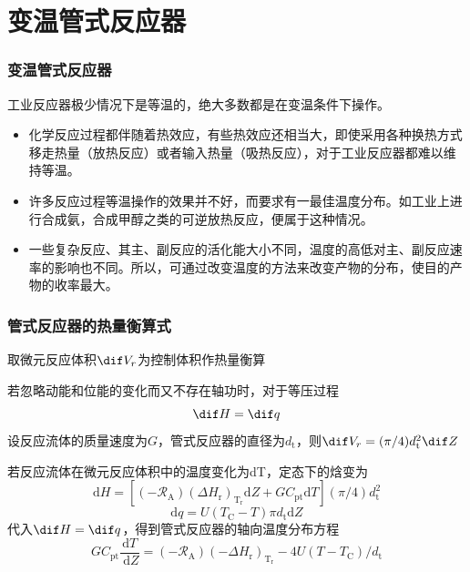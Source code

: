 \section{变温管式反应器}


\begin{frame}
    \frametitle{变温管式反应器}

    工业反应器极少情况下是等温的，绝大多数都是在变温条件下操作。
    \begin{itemize}
        \item 化学反应过程都伴随着热效应，有些热效应还相当大，即使采用各种换热方式移走热量（放热反应）或者输入热量（吸热反应），对于工业反应器都难以维持等温。
        \item 许多反应过程等温操作的效果并不好，而要求有一最佳温度分布。如工业上进行合成氨，合成甲醇之类的可逆放热反应，便属于这种情况。
        \item 一些复杂反应、其主、副反应的活化能大小不同，温度的高低对主、副反应速率的影响也不同。所以，可通过改变温度的方法来改变产物的分布，使目的产物的收率最大。
    \end{itemize}

\end{frame}


\begin{frame}
    \frametitle{管式反应器的热量衡算式}

    取微元反应体积$\dif V_r$为控制体积作热量衡算

    若忽略动能和位能的变化而又不存在轴功时，对于等压过程
    \[
        \dif H = \dif q
    \]
    设反应流体的质量速度为$G$，管式反应器的直径为$d_\mathrm{t}$，则$\dif V_r = (\pi / 4) d_\mathrm{t}^2 \dif Z$

    若反应流体在微元反应体积中的温度变化为dT，定态下的焓变为
    \[
        \mathrm{d} H=[(-\mathscr{R}_{\mathrm{A}})(\Delta H_{\mathrm{r}})_{\mathrm{T}_{\mathrm{r}}} \mathrm{d} Z+G C_{\mathrm{pt}} \mathrm{d} T](\pi / 4) d_{\mathrm{t}}^{2}
    \]
    \[
        \mathrm{d} q=U(T_{\mathrm{C}}-T) \pi d_{\mathrm{t}} \mathrm{d} Z
    \]
    代入$\dif H = \dif q$，得到管式反应器的轴向温度分布方程
    \[
        G C_{\mathrm{pt}} \frac{\mathrm{d} T}{\mathrm{~d} Z}=(-\mathscr{R}_{\mathrm{A}})(-\Delta H_{\mathrm{r}})_{\mathrm{T}_{\mathrm{r}}}-4 U(T-T_{\mathrm{C}}) / d_{\mathrm{t}}
    \]

\end{frame}


